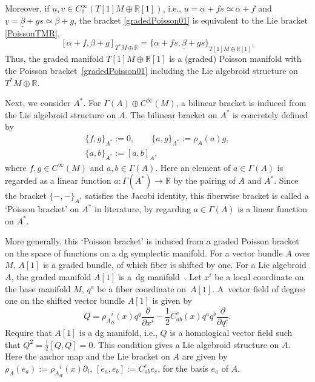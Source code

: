 \documentclass[pdftex]{sigma}
\numberwithin{equation}{section}
\def\bR{{\mathbb{R}}}
\newcommand{\sbv}[2]{{\{{{#1},{#2}}\}}}
\newcommand{\rhoa}{{\rho_A}}
\newcommand{\uu}{{\underline{u}}{}}
\newcommand{\uv}{{\underline{v}}{}}
\newcommand{\ualpha}{{\underline{\alpha}}{}}
\newcommand{\ubeta}{{\underline{\beta}}{}}
\begin{document}
Moreover, if
$\uu, \uv \in C_1^{\infty}(T[1]M \oplus \bR[1])$, i.e.,
$\uu = \ualpha + fs \simeq \alpha + f$ and
$\uv = \ubeta + g s \simeq \beta + g$,
the bracket \eqref{gradedPoisson01} is equivalent to
the Lie bracket \eqref{PoissonTMR},
\[
[\alpha + f, \beta + g]_{T^*M \oplus \bR}
=
\sbv{\ualpha + fs}{\ubeta + g s }_{T[1]M \oplus \bR[1]}.
\]
Thus, the graded manifold $T[1]M \oplus \bR[1]$ is a (graded)
Poisson manifold with the Poisson bracket~\eqref{gradedPoisson01}
including the Lie algebroid structure on $T^*M \oplus \bR$.


Next, we consider $A^*$.
For $\Gamma(A) \oplus C^{\infty}(M)$, a bilinear bracket is induced
from the Lie algebroid structure on $A$.
The bilinear bracket on $A^*$ is concretely defined by
\cite{Blohmann:2023}
\begin{gather}%
\{f, g \}_{A^*} := 0,
\label{PoissonA01}
\qquad
\{a, g \}_{A^*} := \rhoa(a) g,
\\
\{a, b \}_{A^*} := [a, b]_A,
\label{PoissonA03}
\end{gather}
where $f, g \in C^{\infty}(M)$ and $a, b \in \Gamma(A)$.
Here an element of $a \in \Gamma(A)$ is regarded as a
linear function $a\colon \Gamma(A^*) \rightarrow \bR$
by the pairing of $A$ and $A^*$.
Since the bracket $\{-, -\}_{A^*}$ satisfies the Jacobi identity,
this fiberwise bracket is called a `Poisson bracket' on $A^*$
in literature, by regarding $a \in \Gamma(A)$ is a linear function
on $A^*$.


More generally, this `Poisson bracket'
is induced from a graded Poisson bracket
on the space of functions on a dg symplectic manifold.
For a vector bundle $A$ over $M$, $A[1]$ is a graded bundle,
of which fiber is shifted by one.
For a Lie algebroid $A$, the graded manifold $A[1]$ is
a~dg manifold~\cite{Vaintrob}.
Let $x^i$ be a local coordinate on the base manifold $M$,
$q^a$ be a fiber coordinate on~$A[1]$.
A~vector field of degree one on the shifted vector bundle
$A[1]$ is given by
\[
Q = \rhoa^i_a(x) q^q \frac{\partial}{\partial x^i}
- \frac{1}{2} C_{ab}^c(x) q^a q^b \frac{\partial}{\partial q^c}.
\]
Require that $A[1]$ is a dg manifold, i.e., $Q$ is a homological vector field
such that $Q^2 = \frac{1}{2} [Q, Q]\allowbreak =0$.
This condition gives a Lie algebroid structure on $A$.
Here the anchor map and the Lie bracket on $A$ are given by
$
\rhoa(e_a) := \rhoa^i_a(x) \partial_i$,
$
[e_a, e_b] := C_{ab}^c e_c$,
for the basis $e_a$ of $A$.
\end{document}
